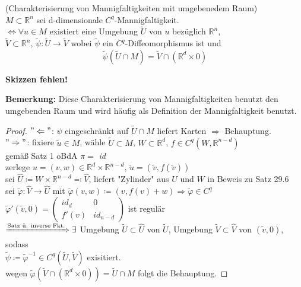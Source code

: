 \begin{sa}
(Charakterisierung von Mannigfaltigkeiten mit umgebenedem Raum) \\
$M \subset \mathbb{R}^n $ sei d-dimensionale $C^q$-Mannigfaltigkeit. \\
$\Longleftrightarrow \forall u \in M $ existiert eine Umgebung $\tilde{U}$ von $u$ 
bezüglich $\mathbb{R}^n$, \\
$\tilde{V} \subset \mathbb{R}^n $, 
$\tilde{\psi}: \tilde{U} \rightarrow \tilde{V} $ wobei $\tilde{\psi} $ 
ein $C^q$-Diffeomorphismus ist und 
    \begin{equation*}
    \tilde{\psi} \left( \tilde{U} \cap M \right) =
    \tilde{V} \cap \left( \mathbb{R}^d \times {0} \right) 
    \end{equation*}

\textbf{Skizzen fehlen!}

\end{sa}

\textbf{Bemerkung:} Diese Charakterisierung von Mannigfaltigkeiten benutzt den umgebenden Raum und wird häufig als Definition der Mannigfaltigkeit benutzt.    
    
\begin{proof}
$"\Leftarrow"$: $\psi $ eingeschränkt auf $\tilde{U} \cap M $ liefert Karten 
$\Rightarrow$ Behauptung. \\
$"\Rightarrow"$: fixiere $\tilde{u} \in M $, wähle $\tilde{U} \subset M $,
$W \subset \mathbb{R}^d $, $f \in C^q \left( W, \mathbb{R}^{n-d} \right)$ \\
gemäß Satz 1 oBdA $\pi = $ \textit{id} \\
zerlege $u = (v,w) \in \mathbb{R}^d \times \mathbb{R}^{n-d}$, 
$\tilde{u} = \left( \tilde{v}, f \left( \tilde{v} \right) \right) $ \\
sei $\hat{U} \coloneqq W \times \mathbb{R}^{n-d} \eqqcolon \hat{V} $,
liefert "Zylinder" aus $U$ und $W$ in Beweis zu Satz 29.6 \\
sei $\tilde{\varphi}: \hat{V} \rightarrow \hat{U} $ mit
$\tilde{\varphi} (v,w) \coloneqq (v, f(v) + w) \Rightarrow \tilde{\varphi} \in C^q $ \\
$\tilde{\varphi}' \left( \tilde{v}, 0 \right) =
    \begin{pmatrix}
    \textit{id}_d & 0 \\
    f'(v)         & \textit{id}_{n-d}
    \end{pmatrix}
$ ist regulär \\
$\xRightarrow{\text{Satz ü. inverse Fkt.}} \exists $ 
Umgebung $ \tilde{U} \subset \hat{U}$ von $\tilde{U}$,
Umgebung $ \tilde{V} \subset \hat{V} $ von $ \left( \tilde{v}, 0 \right) $, sodass \\
$\tilde{\psi} \coloneqq \tilde{\varphi}^{-1} \in C^q \left( \tilde{U}, \tilde{V} \right) $
exisitiert. \\
wegen $\tilde{\varphi} \left( \tilde{V} \cap \left( \mathbb{R}^d \times {0} \right) \right)
= \tilde{U} \cap M $ folgt die Behauptung.
\end{proof}

